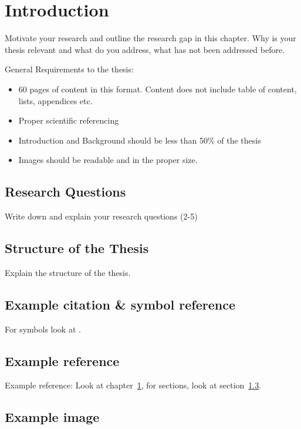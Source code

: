 \chapter{Introduction}\label{chap:introduction}


Motivate your research and outline the research gap in this chapter. Why is your thesis relevant and what do you address, what has not been addressed before. 

General Requirements to the thesis:

\begin{itemize}
	\item 60 pages of content in this format. Content does not include table of content, lists, appendices etc.
	\item Proper scientific referencing
	\item Introduction and Background should be less than 50\% of the thesis
	\item Images should be readable and in the proper size. 
\end{itemize}


\section{Research Questions}

Write down and explain your research questions (2-5)

\section{Structure of the Thesis}

Explain the structure of the thesis. 

\section{Example citation \& symbol reference}\label{sec:citation}
For symbols look at \cite{latex_symbols_2017}.


\section{Example reference}
Example reference: Look at chapter~\ref{chap:introduction}, for sections, look at section~\ref{sec:citation}.

\section{Example image}

